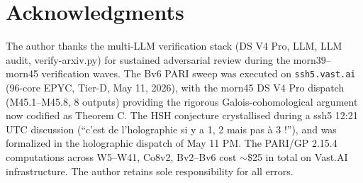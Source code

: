 \documentclass[11pt,a4paper]{amsart}
\theoremstyle{definition}
\begin{document}
\section*{Acknowledgments}

The author thanks the multi-LLM verification stack (DS V4 Pro, LLM, LLM audit, verify-arxiv.py) for sustained adversarial review during the morn39--morn45 verification waves. The Bv6 PARI sweep was executed on \texttt{ssh5.vast.ai} (96-core EPYC, Tier-D, May 11, 2026), with the morn45 DS V4 Pro dispatch (M45.1--M45.8, 8 outputs) providing the rigorous Galois-cohomological argument now codified as Theorem C. The HSH conjecture crystallised during a ssh5 12:21 UTC discussion (``c'est de l'holographie si y a 1, 2 mais pas \`a 3 !''), and was formalized in the holographic dispatch of May 11 PM. The PARI/GP 2.15.4 computations across W5--W41, Co8v2, Bv2--Bv6 cost $\sim$\$25 in total on Vast.AI infrastructure. The author retains sole responsibility for all errors.
\end{document}
